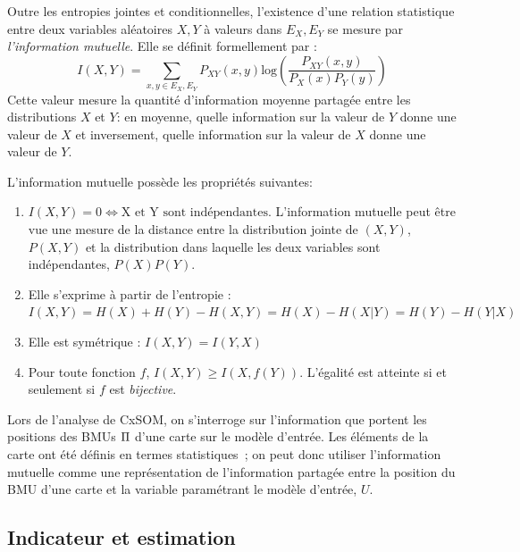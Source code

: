 \documentclass[../main]{subfiles}
\begin{document}
Outre les entropies jointes et conditionnelles, l'existence d'une relation statistique entre deux variables aléatoires $X,Y$ à valeurs dans $E_X,E_Y$ se mesure par \emph{l'information mutuelle}. Elle se définit formellement par : 
\begin{equation}
 I(X,Y) = \sum_{x,y \in E_X,E_Y}{P_{XY}(x,y)\textrm{log}(\frac{P_{XY}(x,y)}{P_X(x)P_Y(y)})}
\end{equation}
Cette valeur mesure la quantité d'information moyenne partagée entre les distributions $X$ et $Y$: en moyenne, quelle information sur la valeur de $Y$ donne une valeur de $X$ et inversement, quelle information sur la valeur de $X$ donne une valeur de $Y$.

L'information mutuelle possède les propriétés suivantes:
\begin{enumerate}
\item $I(X,Y) = 0 \Leftrightarrow \textrm{X et Y sont indépendantes}$. L'information mutuelle peut être vue une mesure de la distance entre la distribution jointe de $(X,Y)$, $P(X,Y)$ et la distribution dans laquelle les deux variables sont indépendantes, $P(X)P(Y)$.
\item Elle s'exprime à partir de l'entropie : $I(X,Y) = H(X) + H(Y) - H(X,Y) = H(X) - H(X|Y) = H(Y) - H(Y|X)$
\item Elle est symétrique : $I(X,Y) = I(Y,X)$
\item Pour toute fonction $f$, $I(X,Y) \geq I(X,f(Y))$. L'égalité est atteinte si et seulement si $f$ est \emph{bijective}.
\end{enumerate}

Lors de l'analyse de CxSOM, on s'interroge sur l'information que portent les positions des BMUs $\Pi$ d'une carte sur le modèle d'entrée.
Les éléments de la carte ont été définis en termes statistiques~; on peut donc utiliser l'information mutuelle comme une représentation de l'information partagée entre la position du BMU d'une carte et la variable paramétrant le modèle d'entrée, $U$.

\subsection{Indicateur et estimation}
\end{document}
